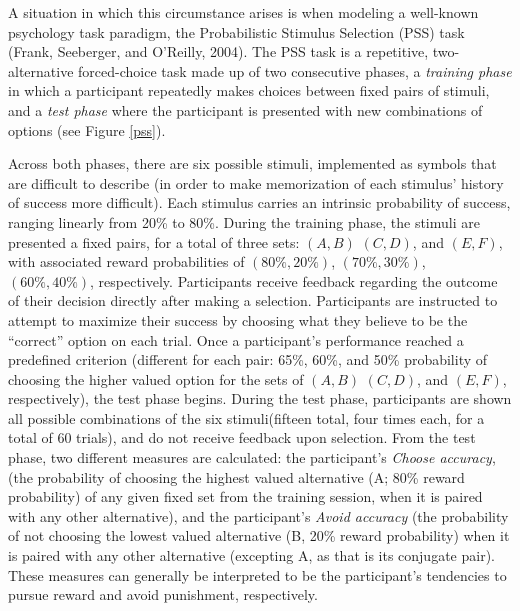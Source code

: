 \documentclass[10pt,letterpaper]{article}
\begin{document}
A situation in which this circumstance arises is when modeling a well-known psychology task paradigm, the Probabilistic Stimulus Selection (PSS) task (Frank, Seeberger, and O'Reilly, 2004). The PSS task is a repetitive, two-alternative forced-choice task made up of two consecutive phases, a \emph{training phase} in which a participant repeatedly makes choices between fixed pairs of stimuli, and a \emph{test phase} where the participant is presented with new combinations of options (see Figure \ref{pss}).

Across both phases, there are six possible stimuli, implemented as symbols that are difficult to describe (in order to make memorization of each stimulus’ history of success more difficult). Each stimulus carries an intrinsic probability of success, ranging linearly from 20\% to 80\%. During the training phase, the stimuli are presented a fixed pairs, for a total of three sets: $(A, B)$  $(C,D)$, and $(E, F)$, with associated reward probabilities of $(80\%, 20\%)$, $(70\%, 30\%)$, $(60\%, 40\%)$, respectively. Participants receive feedback regarding the outcome of their decision directly after making a selection. Participants are instructed to attempt to maximize their success by choosing what they believe to be the ``correct'' option on each trial. Once a participant’s performance reached a predefined criterion (different for each pair: 65\%, 60\%, and 50\% probability of choosing the higher valued option for the sets of $(A, B)$  $(C,D)$, and $(E, F)$, respectively), the test phase begins. During the test phase, participants are shown all possible combinations of the six stimuli(fifteen total, four times each, for a total of 60 trials), and do not receive feedback upon selection. From the test phase, two different measures are calculated: the participant’s \emph{Choose accuracy}, (the probability of choosing the highest valued alternative (A; 80\% reward probability) of any given fixed set from the training session, when it is paired with any other alternative), and the participant’s \emph{Avoid accuracy} (the probability of not choosing the lowest valued alternative (B, 20\% reward probability) when it is paired with any other alternative (excepting A, as that is its conjugate pair). These measures can generally be interpreted to be the participant’s tendencies to pursue reward and avoid punishment, respectively.
\end{document}
